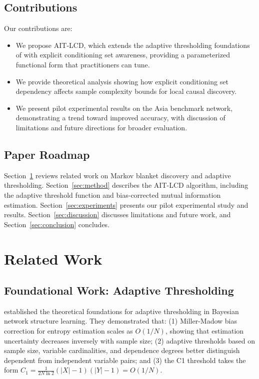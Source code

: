 \documentclass{article}
\theoremstyle{plain}
\theoremstyle{definition}
\begin{document}
\subsection{Contributions}

Our contributions are:
\begin{itemize}
    \item We propose AIT-LCD, which extends the adaptive thresholding foundations of \citet{lerner2013adaptive} with explicit conditioning set awareness, providing a parameterized functional form that practitioners can tune.
    \item We provide theoretical analysis showing how explicit conditioning set dependency affects sample complexity bounds for local causal discovery.
    \item We present pilot experimental results on the Asia benchmark network, demonstrating a trend toward improved accuracy, with discussion of limitations and future directions for broader evaluation.
\end{itemize}

\subsection{Paper Roadmap}

Section~\ref{sec:related} reviews related work on Markov blanket discovery and adaptive thresholding. Section~\ref{sec:method} describes the AIT-LCD algorithm, including the adaptive threshold function and bias-corrected mutual information estimation. Section~\ref{sec:experiments} presents our pilot experimental study and results. Section~\ref{sec:discussion} discusses limitations and future work, and Section~\ref{sec:conclusion} concludes.

\section{Related Work}\label{sec:related}

\subsection{Foundational Work: Adaptive Thresholding}

\citet{lerner2013adaptive} established the theoretical foundations for adaptive thresholding in Bayesian network structure learning. They demonstrated that: (1) Miller-Madow bias correction for entropy estimation scales as $O(1/N)$, showing that estimation uncertainty decreases inversely with sample size; (2) adaptive thresholds based on sample size, variable cardinalities, and dependence degrees better distinguish dependent from independent variable pairs; and (3) the C1 threshold takes the form $C_1 = \frac{1}{2N\ln 2}(|X|-1)(|Y|-1) = O(1/N)$.
\end{document}
